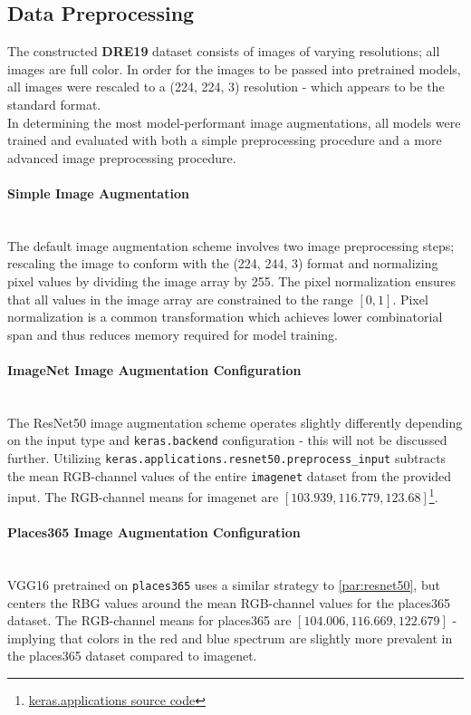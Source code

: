 \subsection{Data Preprocessing}
The constructed \textbf{DRE19} dataset consists of images of varying resolutions; all images are full color. 
In order for the images to be passed into pretrained models, all images were rescaled to a (224, 224, 3) resolution - which appears to be the standard format.
\\
In determining the most model-performant image augmentations, all models were trained and evaluated with both a simple preprocessing procedure and a more advanced image preprocessing procedure. 

\paragraph{Simple Image Augmentation} ~\\
The default image augmentation scheme involves two image preprocessing steps; rescaling the image to conform with the (224, 244, 3) format and normalizing pixel values by dividing the image array by 255. 
The pixel normalization ensures that all values in the image array are constrained to the range $[0,1]$. 
Pixel normalization is a common transformation which achieves lower combinatorial span and thus reduces memory required for model training.

\paragraph{ImageNet Image Augmentation Configuration}\label{par:resnet50} ~\\
The ResNet50 image augmentation scheme operates slightly differently depending on the input type and \texttt{keras.backend} configuration - this will not be discussed further. 
Utilizing \texttt{keras.applications.resnet50.preprocess\_input} subtracts the mean RGB-channel values of the entire \texttt{imagenet} dataset from the provided input. 
The RGB-channel means for imagenet are $[103.939, 116.779, 123.68]$\footnote{\href{https://github.com/keras-team/keras-applications/tree/8a1e4d427999c26d1a1988dda45454769c4372a5/keras_applications}{keras.applications source code}}.

\paragraph{Places365 Image Augmentation Configuration} ~\\
VGG16 pretrained on \texttt{places365}\autocite{gkallia2017keras_places365} uses a similar strategy to \autoref{par:resnet50}, but centers the RBG values around the mean RGB-channel values for the places365 dataset. 
The RGB-channel means for places365 are $[104.006, 116.669, 122.679]$ - implying that colors in the red and blue spectrum are slightly more prevalent in the places365 dataset compared to imagenet.

